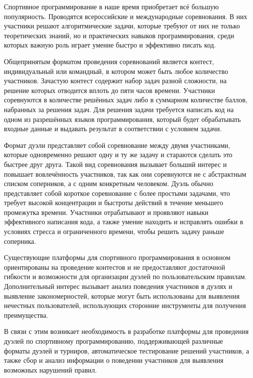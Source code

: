 
Спортивное программирование в наше время приобретает всё большую популярность.
Проводятся всероссийские и международные соревнования.
В них участники решают алгоритмические задачи, которые требуют от них не только теоретических знаний,
но и практических навыков программирования, среди которых важную роль играет умение быстро и эффективно писать код.

Общепринятым форматом проведения соревнований является контест, индивидуальный или командный,
в котором может быть любое количество участников.
Зачастую контест содержит набор задач разной сложности, на решение которых отводится вплоть до пяти часов времени.
Участники соревнуются в количестве решённых задач либо в суммарном количестве баллов, набранных за решения задач.
Для решения задачи требуется написать код на одном из разрешённых языков программирования,
который будет обрабатывать входные данные и выдавать результат в соответствии с условием задачи.

Формат дуэли представляет собой соревнование между двумя участниками,
которые одновременно решают одну и ту же задачу и стараются сделать это быстрее друг друга.
Такой вид соревнования вызывает больший интерес и повышает вовлечённость участников,
так как они соревнуются не с абстрактным списком соперников, а с одним конкретным человеком.
Дуэль обычно представляет собой короткое соревнование с более простыми задачами,
что требует высокой концентрации и быстроты действий в течение меньшего промежутка времени.
Участники отрабатывают и проявляют навыки эффективного написания кода,
а также умение находить и исправлять ошибки в условиях стресса и ограниченного времени, чтобы решить задачу раньше соперника.

Существующие платформы для спортивного программирования в основном ориентированы на проведение контестов
и не предоставляют достаточной гибкости и возможности для организации дуэлей по пользовательским правилам.
Дополнительный интерес вызывает анализ поведения участников в дуэлях и выявление закономерностей,
которые могут быть использованы для выявления нечестных пользователей,
использующих сторонние инструменты для получения преимущества.

В связи с этим возникает необходимость в разработке платформы для проведения дуэлей по спортивному программированию,
поддерживающей различные форматы дуэлей и турниров, автоматическое тестирование решений участников,
а также сбор и анализ информации о поведении участников для выявления возможных нарушений правил.
